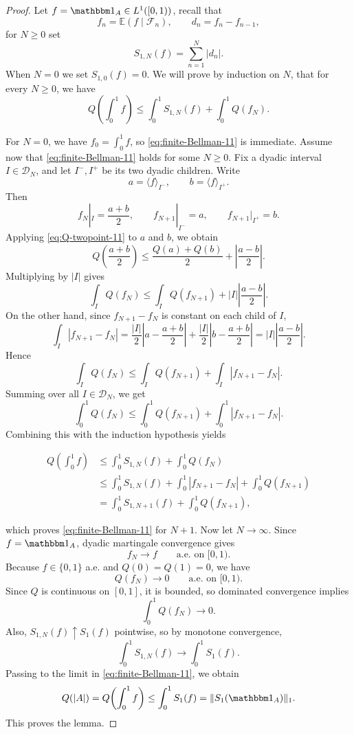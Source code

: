 \documentclass[11pt]{amsart}
\theoremstyle{definition}
\renewcommand{\1}{{\mathbbm{1}}}
\begin{document}
\begin{proof}
Let $f=\mathbbm 1_A\in {L^1([0,1))}$, recall that
\[
f_n=\mathbb E(f\mid \mathcal F_n),\qquad d_n=f_n-f_{n-1},
\]
for $N\ge 0$ set
\[
S_{1,N}(f)=\sum_{n=1}^N |d_n|.
\]
When $N=0$ we set $S_{1, 0}(f)=0$. We will prove by induction on $N$, that for every $N\ge 0$, we have
\begin{equation}\label{eq:finite-Bellman-11}
Q\!\left(\int_0^1 f\right)
\le
\int_0^1 S_{1,N}(f)
+
\int_0^1 Q(f_N).
\end{equation}

For $N=0$, we have $f_0=\int_0^1 f$, so \eqref{eq:finite-Bellman-11} is
immediate.
Assume now that \eqref{eq:finite-Bellman-11} holds for some $N\ge 0$.
Fix a dyadic interval $I\in\mathcal D_N$, and let $I^-,I^+$ be its two dyadic
children. Write
\[
a=\langle f\rangle_{I^-},\qquad b=\langle f\rangle_{I^+}.
\]
Then
\[
f_N|_I=\frac{a+b}{2},\qquad
f_{N+1}|_{I^-}=a,\qquad
f_{N+1}|_{I^+}=b.
\]
Applying \eqref{eq:Q-twopoint-11} to $a$ and $b$, we obtain
\[
Q\!\left(\frac{a+b}{2}\right)
\le
\frac{Q(a)+Q(b)}{2}
+
\left|\frac{a-b}{2}\right|.
\]
Multiplying by $|I|$ gives
\[
\int_I Q(f_N)
\le
\int_I Q(f_{N+1})
+
|I|\left|\frac{a-b}{2}\right|.
\]
On the other hand, since $f_{N+1}-f_N$ is constant on each child of $I$,
\[
\int_I |f_{N+1}-f_N|
=
\frac{|I|}{2}\left|a-\frac{a+b}{2}\right|
+
\frac{|I|}{2}\left|b-\frac{a+b}{2}\right|
=
|I|\left|\frac{a-b}{2}\right|.
\]
Hence
\[
\int_I Q(f_N)
\le
\int_I Q(f_{N+1})
+
\int_I |f_{N+1}-f_N|.
\]
Summing over all $I\in\mathcal D_N$, we get
\[
\int_0^1 Q(f_N)
\le
\int_0^1 Q(f_{N+1})
+
\int_0^1 |f_{N+1}-f_N|.
\]
Combining this with the induction hypothesis yields
\begin{small}
    \begin{align*}
Q\!\left(\int_0^1 f\right)
&\le
\int_0^1 S_{1,N}(f)
+
\int_0^1 Q(f_N) \\
&\le
\int_0^1 S_{1,N}(f)
+
\int_0^1 |f_{N+1}-f_N|
+
\int_0^1 Q(f_{N+1}) \\
&=
\int_0^1 S_{1,N+1}(f)
+
\int_0^1 Q(f_{N+1}),
\end{align*}
\end{small}
which proves \eqref{eq:finite-Bellman-11} for $N+1$.
Now let $N\to\infty$. Since $f=\mathbbm 1_A$, dyadic martingale convergence
gives
\[
f_N\to f
\qquad\text{a.e. on }{[0,1)}.
\]
Because $f\in\{0,1\}$ a.e. and $Q(0)=Q(1)=0$, we have
\[
Q(f_N)\to 0
\qquad\text{a.e. on }{[0,1)}.
\]
Since $Q$ is continuous on $[0,1]$, it is bounded, so dominated convergence
implies
\[
\int_0^1 Q(f_N)\to 0.
\]
Also, $S_{1,N}(f)\uparrow S_1(f)$ pointwise, so by monotone convergence,
\[
\int_0^1 S_{1,N}(f)\to \int_0^1 S_1(f).
\]
Passing to the limit in \eqref{eq:finite-Bellman-11}, we obtain
\[
Q(|A|)
=
Q\!\left(\int_0^1 f\right)
\le
\int_0^1 S_1(f)
=
\|S_1(\mathbbm 1_A)\|_1.
\]
This proves the lemma.
\end{proof}
\end{document}

